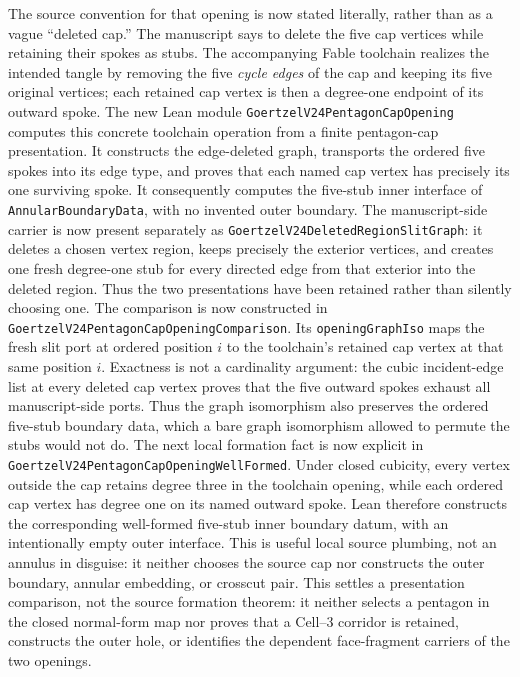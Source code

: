 \documentclass[11pt]{article}
\theoremstyle{definition}
\begin{document}
The source convention for that opening is now stated literally, rather than
as a vague ``deleted cap.''  The manuscript says to delete the five cap
vertices while retaining their spokes as stubs.  The accompanying Fable
toolchain realizes the intended tangle by removing the five \emph{cycle
edges} of the cap and keeping its five original vertices; each retained cap
vertex is then a degree-one endpoint of its outward spoke.  The new Lean
module \texttt{GoertzelV24PentagonCapOpening} computes this concrete toolchain
operation from a finite pentagon-cap presentation.  It constructs the
edge-deleted graph, transports the ordered five spokes into its edge type,
and proves that each named cap vertex has precisely its one surviving spoke.
It consequently computes the five-stub inner interface of
\texttt{AnnularBoundaryData}, with no invented outer boundary.  The
manuscript-side carrier is now present separately as
\texttt{GoertzelV24DeletedRegionSlitGraph}: it deletes a chosen vertex region,
keeps precisely the exterior vertices, and creates one fresh degree-one stub
for every directed edge from that exterior into the deleted region.  Thus the
two presentations have been retained rather than silently choosing one.  The
comparison is now constructed in
\texttt{GoertzelV24PentagonCapOpeningComparison}.  Its
\texttt{openingGraphIso} maps the fresh slit port at ordered position $i$ to
the toolchain's retained cap vertex at that same position $i$.  Exactness is
not a cardinality argument: the cubic incident-edge list at every deleted cap
vertex proves that the five outward spokes exhaust all manuscript-side ports.
Thus the graph isomorphism also preserves the ordered five-stub boundary data,
which a bare graph isomorphism allowed to permute the stubs would not do.
The next local formation fact is now explicit in
\texttt{GoertzelV24PentagonCapOpeningWellFormed}.  Under closed cubicity,
every vertex outside the cap retains degree three in the toolchain opening,
while each ordered cap vertex has degree one on its named outward spoke.  Lean
therefore constructs the corresponding well-formed five-stub inner boundary
datum, with an intentionally empty outer interface.  This is useful local
source plumbing, not an annulus in disguise: it neither chooses the source cap
nor constructs the outer boundary, annular embedding, or crosscut pair.
This settles a presentation comparison, not the source formation theorem:
it neither selects a pentagon in the closed normal-form map nor proves that a
Cell--3 corridor is retained, constructs the outer hole, or identifies the
dependent face-fragment carriers of the two openings.
\end{document}
